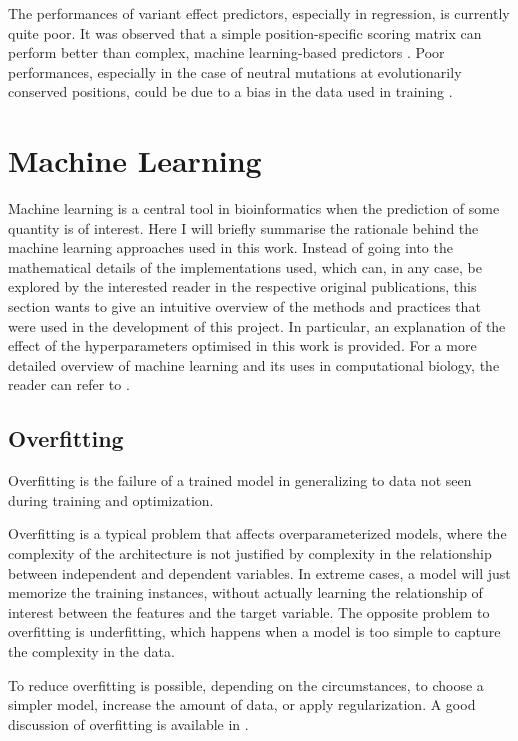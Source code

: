 The performances of variant effect predictors, especially in regression, is currently quite poor.
It was observed that a simple position-specific scoring matrix can perform better than complex, machine learning-based predictors \parencite{Reeb2020}.
Poor performances, especially in the case of neutral mutations at evolutionarily conserved positions, could be due to a bias in the data used in training \parencite{Liu2013}.

\section{Machine Learning}
Machine learning is a central tool in bioinformatics when the prediction of some quantity is of interest.
Here I will briefly summarise the rationale behind the machine learning approaches used in this work.
Instead of going into the mathematical details of the implementations used, which can, in any case, be explored by the interested reader in the respective original publications, this section wants to give an intuitive overview of the methods and practices that were used in the development of this project.
In particular, an explanation of the effect of the hyperparameters optimised in this work is provided.
For a more detailed overview of machine learning and its uses in computational biology, the reader can refer to \textcite{Chicco2017}.

\subsection{Overfitting}
Overfitting is the failure of a trained model in generalizing to data not seen during training and optimization.

Overfitting is a typical problem that affects overparameterized models, where the complexity of the architecture is not justified by complexity in the relationship between independent and dependent variables.
In extreme cases, a model will just memorize the training instances, without actually learning the relationship of interest between the features and the target variable.
The opposite problem to overfitting is underfitting, which happens when a model is too simple to capture the complexity in the data.

To reduce overfitting is possible, depending on the circumstances, to choose a simpler model, increase the amount of data, or apply regularization.
A good discussion of overfitting is available in \textcite{Chicco2017}.


